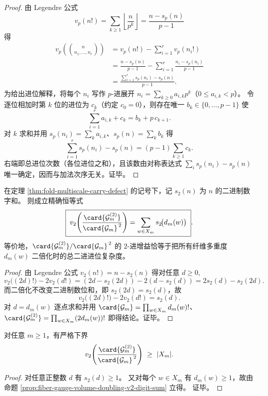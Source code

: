 \begin{proof}
由 Legendre 公式
\[
v_p(n!)=\sum_{k\ge 1}\left\lfloor\frac{n}{p^k}\right\rfloor=\frac{n-s_p(n)}{p-1}
\]
得
\[
\begin{aligned}
v_p\!\left(\binom{n}{n_1,\dots,n_r}\right)
&=v_p(n!)-\sum_{i=1}^{r}v_p(n_i!)\\
&=\frac{n-s_p(n)}{p-1}-\sum_{i=1}^{r}\frac{n_i-s_p(n_i)}{p-1}\\
&=\frac{\sum_{i=1}^{r}s_p(n_i)-s_p(n)}{p-1}.
\end{aligned}
\]
为给出进位解释，将每个 \(n_i\) 写作 \(p\)-进展开 \(n_i=\sum_{k\ge 0}a_{i,k}p^k\)（\(0\le a_{i,k}<p\)）。
令逐位相加时第 \(k\) 位的进位为 \(c_k\)（约定 \(c_0=0\)），则存在唯一 \(b_k\in\{0,\dots,p-1\}\) 使
\[
\sum_{i=1}^{r}a_{i,k}+c_k=b_k+p\,c_{k+1}.
\]
对 \(k\) 求和并用 \(s_p(n_i)=\sum_k a_{i,k}\)、\(s_p(n)=\sum_k b_k\) 得
\[
\sum_{i=1}^{r}s_p(n_i)-s_p(n)=(p-1)\sum_{k\ge 1}c_k.
\]
右端即总进位次数（各位进位之和），且该数由对称表达式 \(\sum_i s_p(n_i)-s_p(n)\) 唯一确定，因而与加法次序无关。证毕。
\end{proof}

\begin{proposition}[二倍化规范体积的二进进位恒等式]\label{prop:fiber-gauge-volume-doubling-v2-digit-sum}
在定理 \ref{thm:fold-multiscale-carry-defect} 的记号下，记 \(s_2(n)\) 为 \(n\) 的二进制数字和。
则成立精确恒等式
\[
\boxed{\;
v_2\!\left(\frac{\card{\mathcal{G}_m^{(2)}}}{\card{\mathcal{G}_m}^{\,2}}\right)
=\sum_{w\in X_m} s_2\!\bigl(d_m(w)\bigr)\; }.
\]
等价地，\(\card{\mathcal{G}_m^{(2)}}/\card{\mathcal{G}_m}^{\,2}\) 的 \(2\)-进增益恰等于把所有纤维多重度 \(d_m(w)\) 二倍化时的总二进进位复杂度。
\end{proposition}
\begin{proof}
由 Legendre 公式 \(v_2(n!)=n-s_2(n)\) 得对任意 \(d\ge 0\),
\[
v_2\bigl((2d)!\bigr)-2v_2(d!)
=(2d-s_2(2d))-2(d-s_2(d))
=2s_2(d)-s_2(2d).
\]
而二倍化不改变二进制数位和，即 \(s_2(2d)=s_2(d)\)，故
\[
v_2\bigl((2d)!\bigr)-2v_2(d!)=s_2(d).
\]
对 \(d=d_m(w)\) 逐点求和并用
\(
\card{\mathcal{G}_m}=\prod_{w\in X_m} d_m(w)!
\)、\(
\card{\mathcal{G}_m^{(2)}}=\prod_{w\in X_m}(2d_m(w))!
\)
即得结论。证毕。
\end{proof}

\begin{corollary}[二进进位增益的规模下界]\label{cor:fiber-gauge-volume-doubling-v2-lowerbound}
对任意 \(m\ge 1\)，有严格下界
\[
v_2\!\left(\frac{\card{\mathcal{G}_m^{(2)}}}{\card{\mathcal{G}_m}^{\,2}}\right)\ \ge\ |X_m|.
\]
\end{corollary}
\begin{proof}
对任意正整数 \(d\) 有 \(s_2(d)\ge 1\)。
又对每个 \(w\in X_m\) 有 \(d_m(w)\ge 1\)，故由命题 \ref{prop:fiber-gauge-volume-doubling-v2-digit-sum} 立得。
证毕。
\end{proof}

